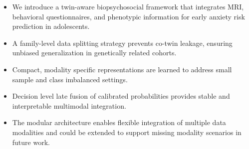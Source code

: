 \documentclass[10pt,letterpaper]{article}
\begin{document}
                                                                                                                          \begin{itemize}
                                                                                                                              \item We introduce a twin-aware biopsychosocial framework that integrates
                                                                                                                                  MRI, behavioral questionnaires, and phenotypic information for early
                                                                                                                                      anxiety risk prediction in adolescents.
                                                                                                                                          \item A family-level data splitting strategy prevents co-twin leakage,
                                                                                                                                              ensuring unbiased generalization in genetically related cohorts.
                                                                                                                                                  \item Compact, modality specific representations are learned to address
                                                                                                                                                      small sample and class imbalanced settings.
                                                                                                                                                          \item Decision level late fusion of calibrated probabilities provides
                                                                                                                                                              stable and interpretable multimodal integration.
                                                                                                                                                                  \item The modular architecture enables flexible integration of multiple
                                                                                                                                                                      data modalities and could be extended to support missing modality
                                                                                                                                                                          scenarios in future work.
                                                                                                                                                                          \end{itemize}
\end{document}
